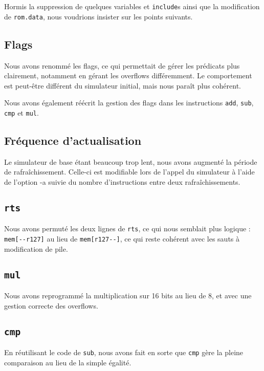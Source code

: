 \documentclass{article}
\begin{document}
Hormis la suppression de quelques variables et {\tt include}s ainsi que la modification de {\tt rom.data}, nous voudrions insister sur les points suivants.

\subsection{Flags}

Nous avons renommé les flags, ce qui permettait de gérer les prédicats plus clairement, notamment en gérant les overflows différemment. Le comportement est peut-être différent du simulateur initial, mais nous paraît plus cohérent.

Nous avons également réécrit la gestion des flags dans les instructions {\tt add}, {\tt sub}, {\tt cmp} et {\tt mul}.

\subsection{Fréquence d'actualisation}
 
 Le simulateur de base étant beaucoup trop lent, nous avons augmenté la période de rafraîchissement. Celle-ci est modifiable lors de l'appel du simulateur à l'aide de l'option -a suivie du nombre d'instructions entre deux rafraîchissements. 
 
\subsection{\tt rts}

Nous avons permuté les deux lignes de {\tt rts}, ce qui nous semblait plus logique : {\tt mem[-{-}r127]} au lieu de {\tt mem[r127-{-}]}, ce qui reste cohérent avec les sauts à modification de pile.

\subsection{\tt mul}

Nous avons reprogrammé la multiplication sur 16 bits au lieu de 8, et avec une gestion correcte des overflows.

\subsection{\tt cmp}

En réutilisant le code de {\tt sub}, nous avons fait en sorte que {\tt cmp} gère la pleine comparaison au lieu de la simple égalité.
\end{document}
